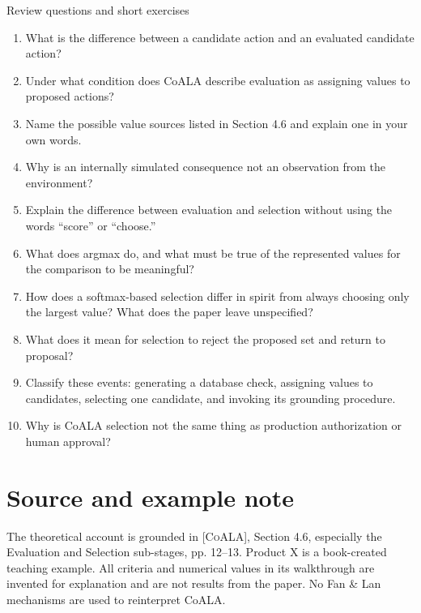 \begin{reviewquestions}{Review questions and short exercises}
\begin{enumerate}
  \item What is the difference between a candidate action and an evaluated candidate action?
  \item Under what condition does CoALA describe evaluation as assigning values to proposed actions?
  \item Name the possible value sources listed in Section 4.6 and explain one in your own words.
  \item Why is an internally simulated consequence not an observation from the environment?
  \item Explain the difference between evaluation and selection without using the words ``score'' or ``choose.''
  \item What does argmax do, and what must be true of the represented values for the comparison to be meaningful?
  \item How does a softmax-based selection differ in spirit from always choosing only the largest value? What does the paper leave unspecified?
  \item What does it mean for selection to reject the proposed set and return to proposal?
  \item Classify these events: generating a database check, assigning values to candidates, selecting one candidate, and invoking its grounding procedure.
  \item Why is CoALA selection not the same thing as production authorization or human approval?
\end{enumerate}
\end{reviewquestions}

\section*{Source and example note}
The theoretical account is grounded in \textsc{[CoALA]}, Section 4.6, especially the Evaluation and Selection sub-stages, pp. 12--13. Product X is a book-created teaching example. All criteria and numerical values in its walkthrough are invented for explanation and are not results from the paper. No Fan \& Lan mechanisms are used to reinterpret CoALA.
